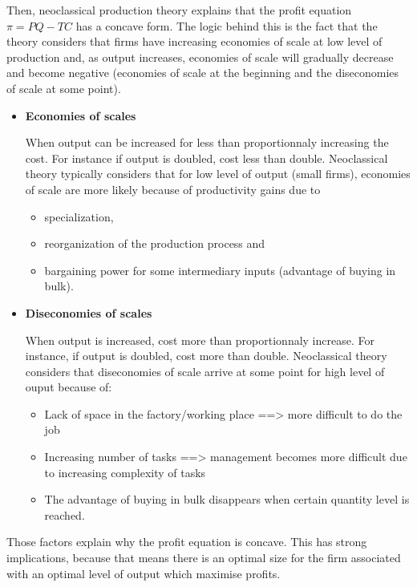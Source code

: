 \documentclass[
  letterpaper,
  DIV=11,
  numbers=noendperiod]{scrreprt}
\providecommand{\tightlist}{%
  \setlength{\itemsep}{0pt}\setlength{\parskip}{0pt}}\usepackage{longtable,booktabs,array}
\begin{document}
Then, neoclassical production theory explains that the profit equation
\(\pi = PQ - TC\) has a concave form. The logic behind this is the fact
that the theory considers that firms have increasing economies of scale
at low level of production and, as output increases, economies of scale
will gradually decrease and become negative (economies of scale at the
beginning and the diseconomies of scale at some point).

\begin{itemize}
\item
  \textbf{Economies of scales}

  When output can be increased for less than proportionnaly increasing
  the cost. For instance if output is doubled, cost less than double.
  Neoclassical theory typically considers that for low level of output
  (small firms), economies of scale are more likely because of
  productivity gains due to

  \begin{itemize}
  \tightlist
  \item
    specialization,
  \item
    reorganization of the production process and
  \item
    bargaining power for some intermediary inputs (advantage of buying
    in bulk).
  \end{itemize}
\item
  \textbf{Diseconomies of scales}

  When output is increased, cost more than proportionnaly increase. For
  instance, if output is doubled, cost more than double. Neoclassical
  theory considers that diseconomies of scale arrive at some point for
  high level of ouput because of:

  \begin{itemize}
  \tightlist
  \item
    Lack of space in the factory/working place ==\textgreater{} more
    difficult to do the job
  \item
    Increasing number of tasks ==\textgreater{} management becomes more
    difficult due to increasing complexity of tasks
  \item
    The advantage of buying in bulk disappears when certain quantity
    level is reached.
  \end{itemize}
\end{itemize}

Those factors explain why the profit equation is concave. This has
strong implications, because that means there is an optimal size for the
firm associated with an optimal level of output which maximise profits.
\end{document}
